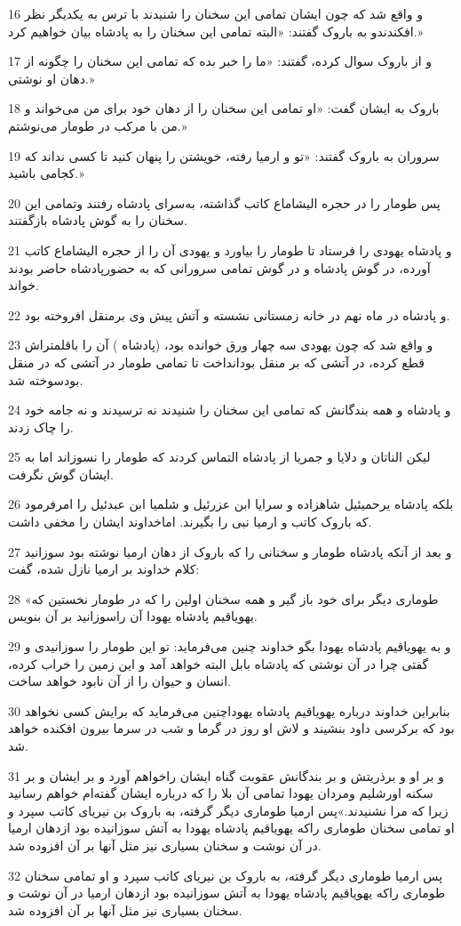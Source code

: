 \par 16 و واقع شد که چون ایشان تمامی این سخنان را شنیدند با ترس به یکدیگر نظر افکندندو به باروک گفتند: «البته تمامی این سخنان را به پادشاه بیان خواهیم کرد.»
\par 17 و از باروک سوال کرده، گفتند: «ما را خبر بده که تمامی این سخنان را چگونه از دهان او نوشتی.»
\par 18 باروک به ایشان گفت: «او تمامی این سخنان را از دهان خود برای من می‌خواند و من با مرکب در طومار می‌نوشتم.»
\par 19 سروران به باروک گفتند: «تو و ارمیا رفته، خویشتن را پنهان کنید تا کسی نداند که کجامی باشید.»
\par 20 پس طومار را در حجره الیشاماع کاتب گذاشته، به‌سرای پادشاه رفتند وتمامی این سخنان را به گوش پادشاه باز‌گفتند.
\par 21 و پادشاه یهودی را فرستاد تا طومار را بیاورد و یهودی آن را از حجره الیشاماع کاتب آورده، در گوش پادشاه و در گوش تمامی سرورانی که به حضورپادشاه حاضر بودند خواند.
\par 22 و پادشاه در ماه نهم در خانه زمستانی نشسته و آتش پیش وی برمنقل افروخته بود.
\par 23 و واقع شد که چون یهودی سه چهار ورق خوانده بود، (پادشاه ) آن را باقلمتراش قطع کرده، در آتشی که بر منقل بودانداخت تا تمامی طومار در آتشی که در منقل بودسوخته شد.
\par 24 و پادشاه و همه بندگانش که تمامی این سخنان را شنیدند نه ترسیدند و نه جامه خود را چاک زدند.
\par 25 لیکن الناتان و دلایا و جمریا از پادشاه التماس کردند که طومار را نسوزاند اما به ایشان گوش نگرفت.
\par 26 بلکه پادشاه یرحمیئیل شاهزاده و سرایا ابن عزرئیل و شلمیا ابن عبدئیل را امرفرمود که باروک کاتب و ارمیا نبی را بگیرند. اماخداوند ایشان را مخفی داشت.
\par 27 و بعد از آنکه پادشاه طومار و سخنانی را که باروک از دهان ارمیا نوشته بود سوزانید کلام خداوند بر ارمیا نازل شده، گفت:
\par 28 «طوماری دیگر برای خود باز گیر و همه سخنان اولین را که در طومار نخستین که یهویاقیم پادشاه یهودا آن راسوزانید بر آن بنویس.
\par 29 و به یهویاقیم پادشاه یهودا بگو خداوند چنین می‌فرماید: تو این طومار را سوزانیدی و گفتی چرا در آن نوشتی که پادشاه بابل البته خواهد آمد و این زمین را خراب کرده، انسان و حیوان را از آن نابود خواهد ساخت.
\par 30 بنابراین خداوند درباره یهویاقیم پادشاه یهوداچنین می‌فرماید که برایش کسی نخواهد بود که برکرسی داود بنشیند و لاش او روز در گرما و شب در سرما بیرون افکنده خواهد شد.
\par 31 و بر او و برذریتش و بر بندگانش عقوبت گناه ایشان راخواهم آورد و بر ایشان و بر سکنه اورشلیم ومردان یهودا تمامی آن بلا را که درباره ایشان گفته‌ام خواهم رسانید زیرا که مرا نشنیدند.»پس ارمیا طوماری دیگر گرفته، به باروک بن نیریای کاتب سپرد و او تمامی سخنان طوماری راکه یهویاقیم پادشاه یهودا به آتش سوزانیده بود ازدهان ارمیا در آن نوشت و سخنان بسیاری نیز مثل آنها بر آن افزوده شد.
\par 32 پس ارمیا طوماری دیگر گرفته، به باروک بن نیریای کاتب سپرد و او تمامی سخنان طوماری راکه یهویاقیم پادشاه یهودا به آتش سوزانیده بود ازدهان ارمیا در آن نوشت و سخنان بسیاری نیز مثل آنها بر آن افزوده شد.
 
